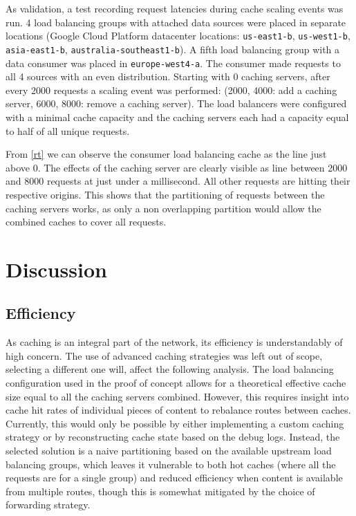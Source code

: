 \documentclass[conference]{IEEEtran}
\begin{document}
As validation, a test recording request latencies during cache scaling events was run.
4 load balancing groups with attached data sources were placed in separate locations
(Google Cloud Platform datacenter locations:
\texttt{us-east1-b}, \texttt{us-west1-b}, \texttt{asia-east1-b}, \texttt{australia-southeast1-b}).
A fifth load balancing group with a data consumer was placed in \texttt{europe-west4-a}.
The consumer made requests to all 4 sources with an even distribution.
Starting with 0 caching servers, after every 2000 requests a scaling event was performed:
(2000, 4000: add a caching server, 6000, 8000: remove a caching server).
The load balancers were configured with a minimal cache capacity
and the caching servers each had a capacity equal to half of all unique requests.


From \ref{rt} we can observe the consumer load balancing cache as the line just above 0.
The effects of the caching server are clearly visible as line between 2000 and 8000 requests
at just under a millisecond.
All other requests are hitting their respective origins.
This shows that the partitioning of requests between the caching servers works,
as only a non overlapping partition would allow the combined caches to cover all requests.

\section*{Discussion}

    \subsection*{Efficiency}
    As caching is an integral part of the network,
    its efficiency is understandably of high concern.
    The use of advanced caching strategies was left out of scope,
    selecting a different one will, affect the following analysis.
    The load balancing configuration used in the proof of concept
    allows for a theoretical effective cache size
    equal to all the caching servers combined.
    However, this requires insight into cache hit rates
    of individual pieces of content to rebalance routes between caches.
    Currently, this would only be possible by either implementing a custom
    caching strategy or by reconstructing cache state based on the debug logs.
    Instead, the selected solution is a naive partitioning
    based on the available upstream load balancing groups,
    which leaves it vulnerable to both hot caches
    (where all the requests are for a single group)
    and reduced efficiency when content is available from multiple routes,
    though this is somewhat mitigated by the choice of forwarding strategy.
\end{document}
